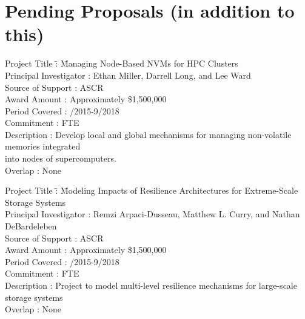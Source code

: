 \documentclass[10pt]{article}
\begin{document}
\section*{Pending Proposals (in addition to this)}

\begin{tabbing}
Project Title \hspace{5.5em}\=: \= Managing Node-Based NVMs for HPC Clusters\\
Principal Investigator      \>: \> Ethan Miller, Darrell Long, and Lee Ward\\
Source of Support           \>: \> ASCR\\
Award Amount                \>: \> Approximately \$1,500,000\\
Period Covered              \>: /2015-9/2018\\
Commitment                  \>:  FTE\\
Description                 \>: \> Develop local and global mechanisms for managing non-volatile memories integrated \\
 \> \>into nodes of supercomputers.\\
Overlap                     \>: \> None\\
\end{tabbing}

\begin{tabbing}
Project Title \hspace{5.5em}\=: \= Modeling Impacts of Resilience Architectures for Extreme-Scale Storage Systems\\
Principal Investigator      \>: \> Remzi Arpaci-Dusseau, Matthew L. Curry, and Nathan DeBardeleben\\
Source of Support           \>: \> ASCR\\
Award Amount                \>: \> Approximately \$1,500,000\\
Period Covered              \>: /2015-9/2018\\
Commitment                  \>:  FTE\\
Description                 \>: \> Project to model multi-level resilience mechanisms for large-scale storage systems\\
Overlap                     \>: \> None\\
\end{tabbing}
\end{document}
